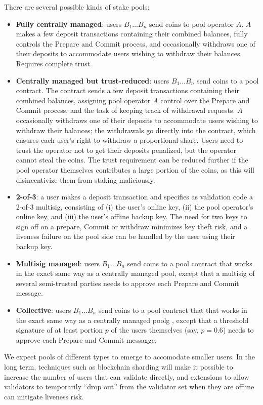 \documentclass[12pt, final]{article}
\begin{document}
There are several possible kinds of stake pools:

\begin{itemize}
\item \textbf{Fully centrally managed}: users $B_1 \ldots B_n$ send coins to pool operator $A$. $A$ makes a few deposit transactions containing their combined balances, fully controls the Prepare and Commit process, and occasionally withdraws one of their deposits to accommodate users wishing to withdraw their balances. Requires complete trust.
\item \textbf{Centrally managed but trust-reduced}: users $B_1 \ldots B_n$ send coins to a pool contract. The contract sends a few deposit transactions containing their combined balances, assigning pool operator $A$ control over the Prepare and Commit process, and the task of keeping track of withdrawal requests. $A$ occasionally withdraws one of their deposits to accommodate users wishing to withdraw their balances; the withdrawals go directly into the contract, which ensures each user's right to withdraw a proportional share. Users need to trust the operator not to get their deposits penalized, but the operator cannot steal the coins. The trust requirement can be reduced further if the pool operator themselves contributes a large portion of the coins, as this will disincentivize them from staking maliciously.
\item \textbf{2-of-3}: a user makes a deposit transaction and specifies as validation code a 2-of-3 multisig, consisting of (i) the user's online key, (ii) the pool operator's online key, and (iii) the user's offline backup key. The need for two keys to sign off on a prepare, Commit or withdraw minimizes key theft risk, and a liveness failure on the pool side can be handled by the user using their backup key.
\item \textbf{Multisig managed}: users $B_1 \ldots B_n$ send coins to a pool contract that works in the exact same way as a centrally managed pool, except that a multisig of several semi-trusted parties needs to approve each Prepare and Commit message.
\item \textbf{Collective}: users $B_1 \ldots B_n$ send coins to a pool contract that that works in the exact same way as a centrally managed poolg
, except that a threshold signature of at least portion $p$ of the users themselves (say, $p = 0.6$) needs to approve each Prepare and Commit messagge.
\end{itemize}

We expect pools of different types to emerge to accomodate smaller users. In the long term, techniques such as blockchain sharding will make it possible to increase the number of users that can validate directly, and extensions to allow validators to temporarily ``drop out'' from the validator set when they are offline can mitigate liveness risk.
\end{document}
